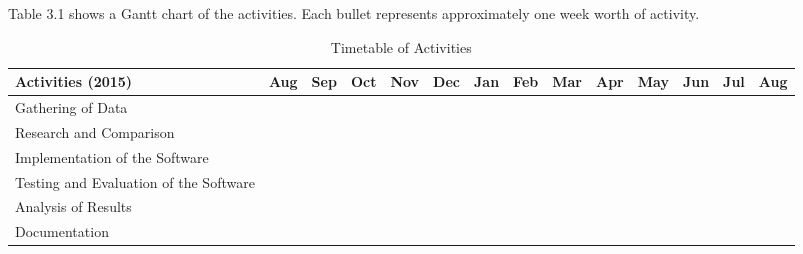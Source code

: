 Table 3.1 shows a Gantt chart of the activities. Each bullet represents approximately one week worth of activity.

%
%
\newcommand{\weekone}{\textbullet}
\newcommand{\weektwo}{\textbullet \textbullet}
\newcommand{\weekthree}{\textbullet \textbullet \textbullet}
\newcommand{\weekfour}{\textbullet \textbullet \textbullet \textbullet}

%
%
\begin{comment}
   \newcommand{\weekone}{$\star$}
   \newcommand{\weektwo}{$\star \star$}
   \newcommand{\weekthree}{$\star \star \star$}
   \newcommand{\weekfour}{$\star \star \star \star$ }
\end{comment}



\begin{table}[ht]   %
\centering
\caption{Timetable of Activities} \vspace{0.25em}
\begin{tabular}{|p{2in}|c|c|c|c|c|c|c|c|} \hline
\centering Activities (2015) & Aug & Sep & Oct & Nov & Dec & Jan & Feb & Mar & Apr & May & Jun & Jul & Aug \\ \hline
Gathering of Data      & ~~~\weekone & \weekfour &  &  &  &  &  & & & & & \\ \hline
Research and Comparison &   & ~~~\weektwo & \weekfour &  &  &  & & & & & &  \\ \hline
Implementation of the Software      &   &  & ~~~\weektwo & \weektwo~~~ &  ~~\weekthree &  & & & & & &  \\ \hline
Testing and Evaluation of the Software     &   &  &  &  & ~~~\weektwo & \weekfour & & & & & &  \\ \hline
Analysis of Results      &   &  &  &  &  &  & \weekfour& & & & &  \\ \hline
Documentation & ~~~\weektwo  & \weekfour & \weekfour & \weektwo~~~ & ~~\weekthree & \weekfour & \weekfour & & & & & \\ \hline
\end{tabular}
\label{tab:timetableactivities}
\end{table}

